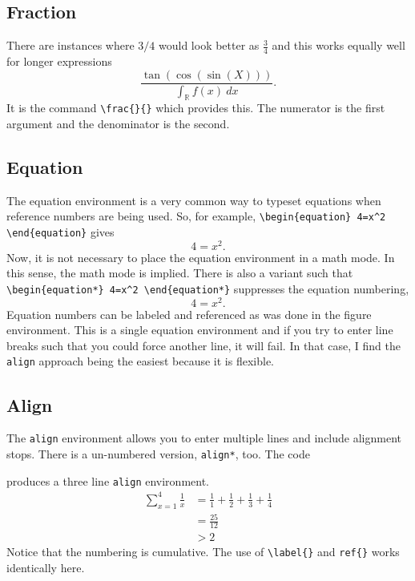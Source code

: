 \subsection*{Fraction}
There are instances where $3/4$ would look better as $\frac{3}{4}$ and
this works equally well for longer expressions $$
\frac{\tan\left(\cos\left(\sin (X) \right)\right)}{\int_{\mathbb{R}}
  f(x) ~ dx}.$$ It is the command \verb!\frac{}{}! which provides
this. The numerator is the first argument and the denominator is the
second.
\subsection*{Equation}
The equation environment is a very common way to typeset equations
when reference numbers are being used. So, for example,
\verb!\begin{equation} 4=x^2 \end{equation}! gives 
\begin{equation}
  4=x^2.
\end{equation}
Now, it is not necessary to place the equation environment in a math
mode. In this sense, the math mode is implied. There is also a variant
such that \verb!\begin{equation*} 4=x^2 \end{equation*}! suppresses
the equation numbering,
\begin{equation*} 
  4=x^2.
\end{equation*}
Equation numbers can be labeled and referenced as was done in the
figure environment. This is a single equation environment and if you
try to enter line breaks such that you could force another line, it
will fail. In that case, I find the \texttt{align} approach being the
easiest because it is flexible.

\subsection*{Align}
The \texttt{align} environment allows you to enter multiple lines and
include alignment stops. There is a un-numbered version,
\texttt{align*}, too. The code

produces a three line \texttt{align} environment.
\begin{align}
   \sum_{x=1}^{4} \frac{1}{x}
   &= \frac{1}{1} + \frac{1}{2}  + \frac{1}{3} + \frac{1}{4} \\
   &= \frac{25}{12} \\
   &>2   
\end{align}
Notice that the numbering is cumulative. The use of \verb!\label{}!
and \verb!ref{}! works identically here.


